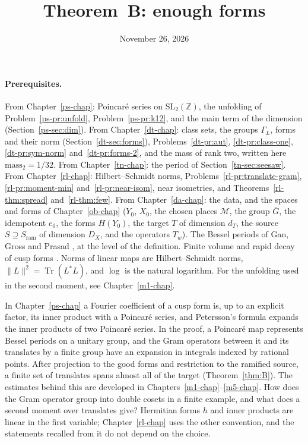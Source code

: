 \documentclass[reqno]{amsart}
\title{Theorem~B: enough forms}
\author{}
\date{November 26, 2026}
\newcounter{chap}
\theoremstyle{definition}
\theoremstyle{plain}
\theoremstyle{remark}
\newcommand{\Z}{{\mathbb{Z}}}
\newcommand{\cMc}{\mathcal M}
\newcommand{\Gb}{\bar G}
\newcommand{\Tr}{\operatorname{Tr}}
\newcommand{\Sr}{S_{\mathrm{ram}}}
\begin{document}
\maketitle
{}\label{chap}

\paragraph{Prerequisites.}
From Chapter~\ref{ps-chap}: Poincar\'e series on \(\mathrm{SL}_2(\Z)\), the unfolding of Problem~\ref{ps-pr:unfold}, Problem~\ref{ps-pr:k12}, and the main term of the dimension (Section~\ref{ps-sec:dim}).  From Chapter~\ref{dt-chap}: class sets, the groups \(\Gamma_L\), forms and their norm (Section~\ref{dt-sec:forms}), Problems~\ref{dt-pr:aut}, \ref{dt-pr:class-one}, \ref{dt-pr:sym-norm} and~\ref{dt-pr:forms-2}, and the mass of rank two, written here \(\mathrm{mass}_2=1/32\).  From Chapter~\ref{tn-chap}: the period of Section~\ref{tn-sec:seesaw}.  From Chapter~\ref{rl-chap}: Hilbert--Schmidt norms, Problems~\ref{rl-pr:translate-gram}, \ref{rl-pr:moment-min} and~\ref{rl-pr:near-isom}, near isometries, and Theorems~\ref{rl-thm:spread} and~\ref{rl-thm:few}.  From Chapter~\ref{da-chap}: the data, and the spaces and forms of Chapter~\ref{ob-chap} (\(Y_0\), \(X_0\), the chosen places \(\cMc\), the group \(\Gb\), the idempotent \(e_0\), the forms \(H(Y_0)\), the target \(T\) of dimension \(d_T\), the source \(S\supseteq\Sr\) of dimension \(D_X\), and the operators \(T_w\)).  The Bessel periods of Gan, Gross and Prasad \cite[\S\S12, 23]{GGP}, at the level of the definition.  Finite volume \cite{Bo63} and rapid decay of cusp forms \cite{BoPC}.  Norms of linear maps are Hilbert--Schmidt norms, \(\lVert L\rVert^2=\Tr(L^*L)\), and \(\log\) is the natural logarithm.  For the unfolding used in the second moment, see Chapter~\ref{m1-chap}.

\medskip
In Chapter~\ref{ps-chap} a Fourier coefficient of a cusp form is, up to an explicit factor, its inner product with a Poincar\'e series, and Petersson's formula expands the inner products of two Poincar\'e series.  In the proof, a Poincar\'e map represents Bessel periods on a unitary group, and the Gram operators between it and its translates by a finite group have an expansion in integrals indexed by rational points.  After projection to the good forms and restriction to the ramified source, a finite set of translates spans almost all of the target (Theorem~\ref{thm:B}).  The estimates behind this are developed in Chapters~\ref{m1-chap}--\ref{m5-chap}.  How does the Gram operator group into double cosets in a finite example, and what does a second moment over translates give?  Hermitian forms \(h\) and inner products are linear in the first variable; Chapter~\ref{rl-chap} uses the other convention, and the statements recalled from it do not depend on the choice.
\end{document}

